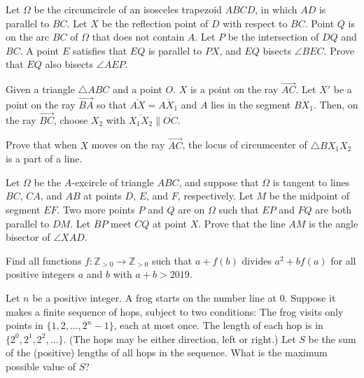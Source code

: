 \documentclass[11pt]{scrartcl}
\begin{document}
\begin{problem}[165465510156789]
	Let $\Omega$ be the circumcircle of an isosceles trapezoid $ABCD$, in which $AD$ is parallel to $BC$. Let $X$ be the reflection point of $D$ with respect to $BC$. Point $Q$ is on the arc $BC$ of $\Omega$ that does not contain $A$. Let $P$ be the intersection of $DQ$ and $BC$. A point $E$ satisfies that $EQ$ is parallel to $PX$, and $EQ$ bisects $\angle BEC$. Prove that $EQ$ also bisects $\angle AEP$.
\end{problem}
\begin{problem}[1790114062253914451]
	Given a triangle $ \triangle{ABC} $ and a point $ O $. $ X $ is a point on the ray $ \overrightarrow{AC} $. Let $ X' $ be a point on the ray $ \overrightarrow{BA} $ so that $ \overline{AX} = \overline{AX_{1}} $ and $ A $ lies in the segment $ \overline{BX_{1}} $. Then, on the ray $ \overrightarrow{BC} $, choose $ X_{2} $ with $ \overline{X_{1}X_{2}} \parallel \overline{OC} $.

Prove that when $ X $ moves on the ray $ \overrightarrow{AC} $, the locus of circumcenter of $ \triangle{BX_{1}X_{2}} $ is a part of a line.
\end{problem}
\begin{problem}[6566259136811987209]
	Let $\Omega$ be the $A$-excircle of triangle $ABC$, and suppose that $\Omega$ is tangent to lines $BC$, $CA$, and $AB$ at points $D$, $E$, and $F$, respectively. Let $M$ be the midpoint of segment $EF$. Two more points $P$ and $Q$ are on $\Omega$ such that $EP$ and $FQ$ are both parallel to $DM$. Let $BP$ meet $CQ$ at point $X$. Prove that the line $AM$ is the angle bisector of $\angle XAD$.
\end{problem}
\begin{problem}[3435532350205377704]
Find all functions $f:\mathbb Z_{>0}\to \mathbb Z_{>0}$ such that $a+f(b)$ divides $a^2+bf(a)$ for all positive integers $a$ and $b$ with $a+b>2019$.
\end{problem}
\begin{problem}[1302548092028853470]
Let $n$ be a positive integer. A frog starts on the number line at $0$. Suppose it makes a finite sequence of hops, subject to two conditions:
The frog visits only points in $\{1, 2, \dots, 2^n-1\}$, each at most once.
The length of each hop is in $\{2^0, 2^1, 2^2, \dots\}$. (The hops may be either direction, left or right.)
Let $S$ be the sum of the (positive) lengths of all hops in the sequence. What is the maximum possible value of $S$?
\end{problem}
\end{document}
